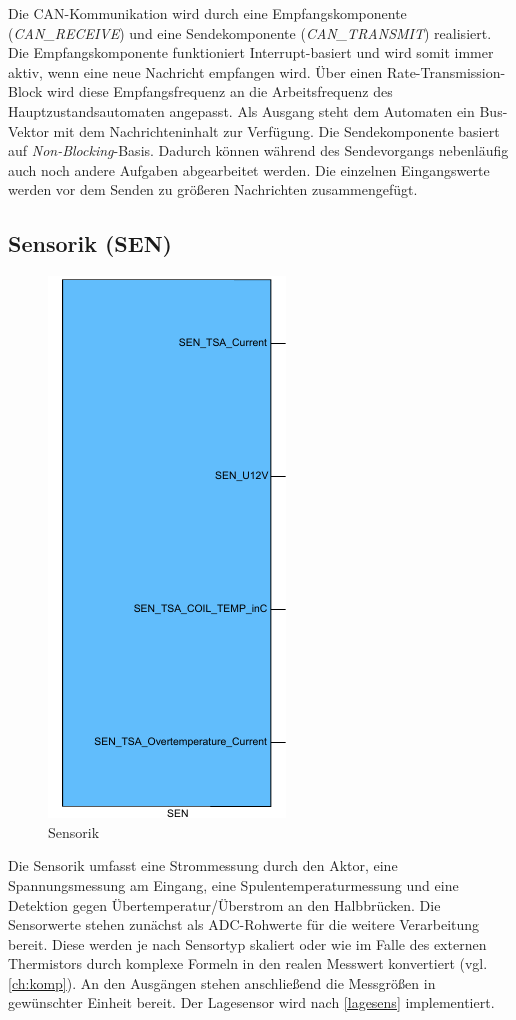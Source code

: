 Die CAN-Kommunikation wird durch eine Empfangskomponente (\textit{CAN\_RECEIVE}) und eine Sendekomponente (\textit{CAN\_TRANSMIT}) realisiert. Die Empfangskomponente funktioniert Interrupt-basiert und wird somit immer aktiv, wenn eine neue Nachricht empfangen wird. Über einen Rate-Transmission-Block wird diese Empfangsfrequenz an die Arbeitsfrequenz des Hauptzustandsautomaten angepasst. Als Ausgang steht dem Automaten ein Bus-Vektor mit dem Nachrichteninhalt zur Verfügung. 
Die Sendekomponente basiert auf \textit{Non-Blocking}-Basis. Dadurch können während des Sendevorgangs nebenläufig auch noch andere Aufgaben abgearbeitet werden. Die einzelnen Eingangswerte werden vor dem Senden zu größeren Nachrichten zusammengefügt.

\subsection{Sensorik (SEN)}\label{SEN}
\begin{figure}[H]%
\centering
\includegraphics[width=0.3\columnwidth]{./Bilder/fig_sen}%
\caption{Sensorik}%
\label{fig_sen}%
\end{figure}
Die Sensorik umfasst eine Strommessung durch den Aktor, eine Spannungsmessung am Eingang, eine Spulentemperaturmessung und eine Detektion gegen Übertemperatur/Überstrom an den Halbbrücken. Die Sensorwerte stehen zunächst als ADC-Rohwerte für die weitere Verarbeitung bereit. Diese werden je nach Sensortyp skaliert oder wie im Falle des externen Thermistors durch komplexe Formeln in den realen Messwert konvertiert (vgl. \autoref{ch:komp}). An den Ausgängen stehen anschließend die Messgrößen in gewünschter Einheit bereit. Der Lagesensor wird nach \autoref{lagesens} implementiert.

